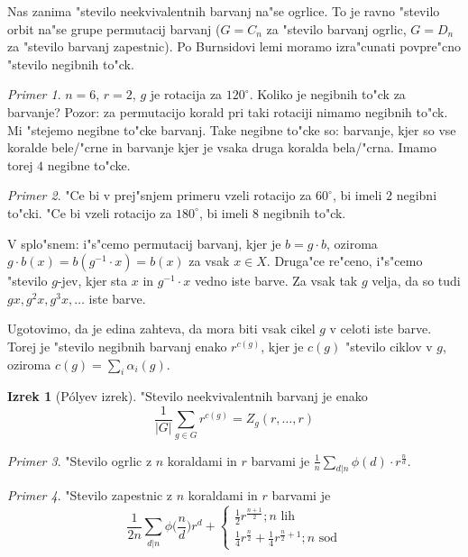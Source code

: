 \documentclass[a4paper,12pt]{article}
\theoremstyle{definition}
\newtheorem{theorem}[counter]{Izrek}
\theoremstyle{remark}
\newtheorem*{ex}{Primer}
\begin{document}
Nas zanima "stevilo neekvivalentnih barvanj na"se ogrlice. To je ravno "stevilo orbit na"se grupe permutacij barvanj ($G=C_n$ za "stevilo barvanj ogrlic, $G=D_n$ za "stevilo barvanj zapestnic).
Po Burnsidovi lemi moramo izra"cunati povpre"cno "stevilo negibnih to"ck.
\begin{ex}
	$n=6$, $r=2$, $g$ je rotacija za $120^{\circ}$. Koliko je negibnih to"ck za barvanje? Pozor: za permutacijo korald pri taki rotaciji nimamo negibnih to"ck. Mi "stejemo negibne to"cke barvanj. Take negibne to"cke so: barvanje, kjer so vse koralde bele/"crne in barvanje kjer je vsaka druga koralda bela/"crna. Imamo torej $4$ negibne to"cke.
\end{ex}
\begin{ex}
	"Ce bi v prej"snjem primeru vzeli rotacijo za $60^{\circ}$, bi imeli $2$ negibni to"cki. "Ce bi vzeli rotacijo za $180^{\circ}$, bi imeli $8$ negibnih to"ck.
\end{ex}

V splo"snem: i"s"cemo permutacij barvanj, kjer je $b = g \cdot b$, oziroma $g\cdot b(x) = b(g^{-1} \cdot x) = b(x)$ za vsak $x \in X$.
Druga"ce re"ceno, i"s"cemo "stevilo $g$-jev, kjer sta $x$ in $g^{-1}\cdot x$ vedno iste barve. Za vsak tak $g$ velja, da so tudi $gx, g^2x, g^3x, \ldots$ iste barve.

Ugotovimo, da je edina zahteva, da mora biti vsak cikel $g$ v celoti iste barve. Torej je "stevilo negibnih barvanj enako $r^{c(g)}$, kjer je $c(g)$ "stevilo ciklov v $g$, oziroma $c(g) = \displaystyle\sum_i \alpha_i(g)$.

\begin{theorem}[P\'{o}lyev izrek]
	"Stevilo neekvivalentnih barvanj je enako
	$$ \frac{1}{\left|G\right| }\sum_{g \in G} r^{c(g)}  = Z_g(r, \ldots, r) $$
\end{theorem}

\begin{ex}
	"Stevilo ogrlic z $n$ koraldami in $r$ barvami je $\frac{1}{n}\sum_{d|n}\phi(d)\cdot r^{\frac{n}{d}}$.
\end{ex}
\begin{ex}
	"Stevilo zapestnic z $n$ koraldami in $r$ barvami je
	\[ \frac{1}{2n} \sum_{d | n} \phi\big(\frac{n}{d}\big) r^d + \begin{cases}\frac{1}{2} r^{\frac{n+1}{2}}; n\text{ lih}\\ \frac{1}{4} r^{\frac{n}{2}} + \frac{1}{4}r^{\frac{n}{2}+1}; n\text{ sod} \end{cases} \]
\end{ex}
\end{document}
